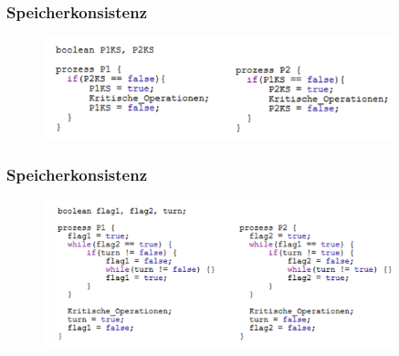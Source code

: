 \documentclass{sikslides}
\begin{document}
\begin{frame}
\frametitle{Speicherkonsistenz}
	\begin{figure}[htbp] 
  \centering
  \includegraphics[width=0.9\textwidth]{figures/problem1.png}
  \label{Fig:gpum}
\end{figure}
\end{frame}

\begin{frame}
\frametitle{Speicherkonsistenz}
	\begin{figure}[htbp] 
  \centering
  \includegraphics[width=0.9\textwidth]{figures/problem2.png}
  \label{Fig:gpum}
\end{figure}
\end{frame}
\end{document}
